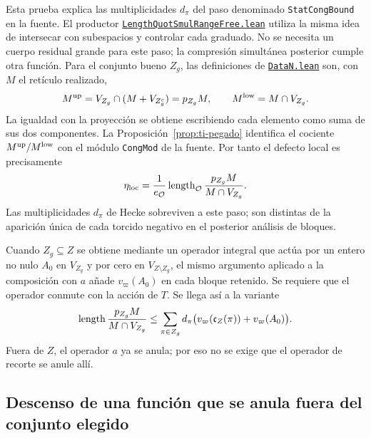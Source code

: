 Esta prueba explica las multiplicidades $d_\pi$ del paso
denominado \texttt{StatCongBound} en la fuente. El productor
\href{https://github.com/CocoSgt/riemann-hypothesis-lean/blob/7cbf7a0c32fca1badf05931879a37c3f8a2b03b4/src/Formalism/CharacterColumnKernels/IdempotentNormalForms/LengthQuotSmulRangeFree.lean}{\nolinkurl{LengthQuotSmulRangeFree.lean}} utiliza la misma idea
de intersecar con subespacios y controlar cada graduado.
No se necesita un cuerpo residual grande para este paso;
la compresión simultánea posterior cumple otra función.
Para el conjunto bueno $Z_g$, las definiciones de
\href{https://github.com/CocoSgt/riemann-hypothesis-lean/blob/7cbf7a0c32fca1badf05931879a37c3f8a2b03b4/src/Formalism/SharpRestriction/LevelLetterCocycles/DataN.lean}{\nolinkurl{DataN.lean}} son, con $M$ el retículo realizado,
\begin{equation}
 M^{\rm up}=V_{Z_g}\cap(M+V_{Z_g^c})=p_{Z_g}M,
 \qquad M^{\rm low}=M\cap V_{Z_g}.
 \label{eq:ti-mtup}
\end{equation}
La igualdad con la proyección se obtiene escribiendo cada
elemento como suma de sus dos componentes.
La Proposición~\ref{prop:ti-pegado} identifica el cociente
$M^{\rm up}/M^{\rm low}$ con el módulo
\texttt{CongMod} de la fuente. Por tanto el defecto local
es precisamente
\begin{equation}
 \eta_{\rm loc}=\frac{1}{e_{\mathcal O}}
      \operatorname{length}_{\mathcal O}\frac{p_{Z_g}M}{M\cap V_{Z_g}}.
 \label{eq:ti-etaloc}
\end{equation}
Las multiplicidades $d_\pi$ de Hecke sobreviven a este paso;
son distintas de la aparición única de cada torcido negativo
en el posterior análisis de bloques.

Cuando $Z_g\subseteq Z$ se obtiene mediante un operador integral
que actúa por un entero no nulo $A_0$ en $V_{Z_g}$ y por cero
en $V_{Z\setminus Z_g}$, el mismo argumento aplicado a la
composición con $a$ añade $v_\varpi(A_0)$ en cada bloque
retenido. Se requiere que el operador conmute con la acción
de $T$. Se llega así a la variante
\begin{equation}
 \operatorname{length}\frac{p_{Z_g}M}{M\cap V_{Z_g}}
 \le\sum_{\pi\in Z_g}d_\pi
       \bigl(v_\varpi(\mathfrak c_Z(\pi))+v_\varpi(A_0)\bigr).
 \label{eq:ti-recorte}
\end{equation}
Fuera de $Z$, el operador $a$ ya se anula; por eso no se
exige que el operador de recorte se anule allí.

\subsection{Descenso de una función que se anula fuera del conjunto elegido}


